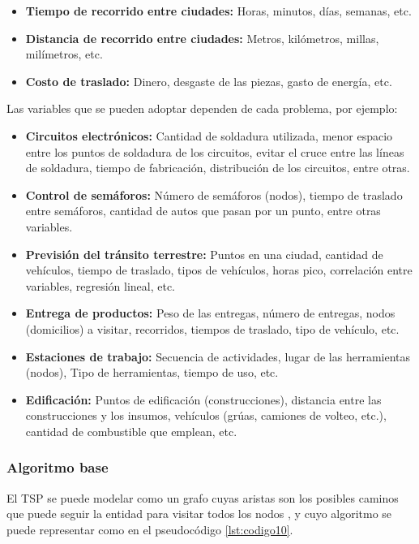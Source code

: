   \begin{itemize} 
      \item \textbf{Tiempo de recorrido entre ciudades:} Horas, minutos, días, semanas, etc.
      \item \textbf{Distancia de recorrido entre ciudades:} Metros, kilómetros, millas, milímetros, etc.
      \item \textbf{Costo de traslado:} Dinero, desgaste de las piezas, gasto de energía, etc.\\
   \end{itemize} 
   
\hspace*{1cm}Las variables que se pueden adoptar dependen de cada problema, por ejemplo:
   \begin{itemize} 
      \item \textbf{Circuitos electrónicos:} Cantidad de soldadura utilizada, menor espacio entre los puntos de soldadura de los circuitos, evitar el cruce entre las líneas de soldadura, tiempo de fabricación, distribución de los circuitos, entre otras.
      \item \textbf{Control de semáforos:} Número de semáforos (nodos), tiempo de traslado entre semáforos, cantidad de autos que pasan por un punto, entre otras variables.
      \item \textbf{Previsión del tránsito terrestre:} Puntos en una ciudad, cantidad de vehículos, tiempo de traslado, tipos de vehículos, horas pico, correlación entre variables, regresión lineal, etc.
      \item \textbf{Entrega de productos:} Peso de las entregas, número de entregas, nodos (domicilios) a visitar, recorridos, tiempos de traslado, tipo de vehículo, etc.
      \item \textbf{Estaciones de trabajo:} Secuencia de actividades, lugar de las herramientas (nodos), Tipo de herramientas, tiempo de uso, etc.
      \item \textbf{Edificación:} Puntos de edificación (construcciones), distancia entre las construcciones y los insumos, vehículos (grúas, camiones de volteo, etc.), cantidad de combustible que emplean, etc.
   \end{itemize} 

 
 \subsubsection {Algoritmo base}
 El TSP se puede modelar como un grafo cuyas aristas son los posibles caminos que puede seguir la entidad para visitar todos los nodos \cite{[ONCAN]}, y cuyo algoritmo se puede representar como en el pseudocódigo \ref{lst:codigo10}.\\
 
